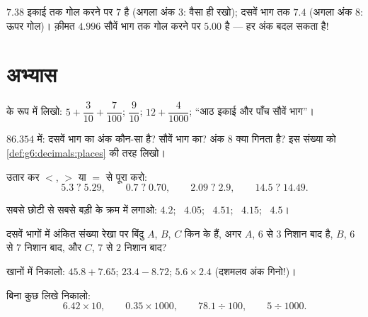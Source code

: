 \begin{example}
$7.38$ इकाई तक गोल करने पर $7$ है (अगला अंक $3$: वैसा ही रखो);
दसवें भाग तक $7.4$ (अगला अंक $8$: ऊपर गोल)। क़ीमत
$4.996$ सौवें भाग तक गोल करने पर $5.00$ है ---  हर अंक बदल
सकता है!
\end{example}

\section{अभ्यास}

\begin{exercise}[$\star$]\label{exo:g6:decimals:1}
 के रूप में लिखो: $5 + \dfrac{3}{10} + \dfrac{7}{100}$;
\quad $\dfrac{9}{10}$; \quad $12 + \dfrac{4}{1000}$;
\quad ``आठ इकाई और पाँच सौवें भाग''।
\end{exercise}

\begin{exercise}[$\star$]\label{exo:g6:decimals:2}
$86.354$ में: दसवें भाग का अंक कौन-सा है? सौवें भाग का? अंक $8$
क्या गिनता है? इस संख्या को \cref{def:g6:decimals:places} की तरह
लिखो।
\end{exercise}

\begin{exercise}[$\star$]\label{exo:g6:decimals:3}
उतार कर $<$, $>$ या $=$ से पूरा करो:
\[
5.3 \;?\; 5.29, \qquad
0.7 \;?\; 0.70, \qquad
2.09 \;?\; 2.9, \qquad
14.5 \;?\; 14.49 .
\]
\end{exercise}

\begin{exercise}[$\star$]\label{exo:g6:decimals:4}
सबसे छोटी से सबसे बड़ी के क्रम में लगाओ:
$4.2$; \ $4.05$; \ $4.51$; \ $4.15$; \ $4.5$।
\end{exercise}

\begin{exercise}[$\star$]\label{exo:g6:decimals:5}
दसवें भागों में अंकित संख्या रेखा पर बिंदु $A$, $B$, $C$ किन
 के हैं, अगर $A$, $6$ से $3$ निशान बाद है, $B$,
$6$ से $7$ निशान बाद, और $C$, $7$ से $2$ निशान बाद?
\end{exercise}

\begin{exercise}[$\star$]\label{exo:g6:decimals:6}
खानों में निकालो: $45.8 + 7.65$; \quad $23.4 - 8.72$; \quad
$5.6 \times 2.4$ (दशमलव अंक गिनो!)।
\end{exercise}

\begin{exercise}[$\star$]\label{exo:g6:decimals:7}
बिना कुछ लिखे निकालो:
\[
6.42 \times 10, \qquad
0.35 \times 1000, \qquad
78.1 \div 100, \qquad
5 \div 1000 .
\]
\end{exercise}

